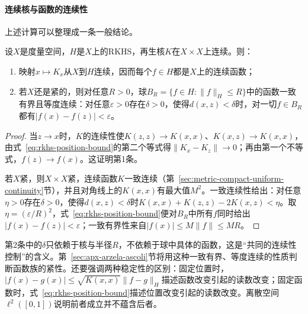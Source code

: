 \paragraph{连续核与函数的连续性}

上述计算可以整理成一条一般结论。

\begin{theorem}[连续核给出连续函数]
\label{thm:rkhs-continuity}
设$X$是度量空间，$H$是$X$上的RKHS，再生核$K$在$X\times X$上连续。则：
\begin{enumerate}
\item 映射$x\mapsto K_x$从$X$到$H$连续，因而每个$f\in H$都是$X$上的连续函数；
\item 若$X$还是紧的，则对任意$R>0$，球$B_R=\{f\in H:\|f\|_H\le R\}$中的函数一致有界且等度连续：对任意$\varepsilon>0$存在$\delta>0$，使得$d(x,z)<\delta$时，对一切$f\in B_R$都有$|f(x)-f(z)|<\varepsilon$。
\end{enumerate}
\end{theorem}

\begin{proof}
当$z\to x$时，$K$的连续性使$K(z,z)\to K(x,x)$、$K(x,z)\to K(x,x)$，由式~\eqref{eq:rkhs-position-bound}的第二个等式得$\|K_x-K_z\|\to0$；再由第一个不等式，$f(z)\to f(x)$。这证明第1条。

若$X$紧，则$X\times X$紧，连续函数$K$一致连续（第~\ref{sec:metric-compact-uniform-continuity}节），并且对角线上的$K(x,x)$有最大值$M^2$。一致连续性给出：对任意$\eta>0$存在$\delta>0$，使得$d(x,z)<\delta$时$K(x,x)+K(z,z)-2K(x,z)<\eta$。取$\eta=(\varepsilon/R)^2$，式~\eqref{eq:rkhs-position-bound}便对$B_R$中所有$f$同时给出$|f(x)-f(z)|<\varepsilon$；一致有界性来自$|f(x)|\le M\|f\|\le MR$。
\end{proof}

第2条中的$\delta$只依赖于核与半径$R$，不依赖于球中具体的函数，这是“共同的连续性控制”的含义。第~\ref{sec:apx-arzela-ascoli}节将用这种一致有界、等度连续的性质判断函数族的紧性。还要强调两种稳定性的区别：固定位置时，$|f(x)-g(x)|\le\sqrt{K(x,x)}\|f-g\|_H$描述函数改变引起的读数改变；固定函数时，式~\eqref{eq:rkhs-position-bound}描述位置改变引起的读数改变。离散空间$\ell^2([0,1])$说明前者成立并不蕴含后者。
